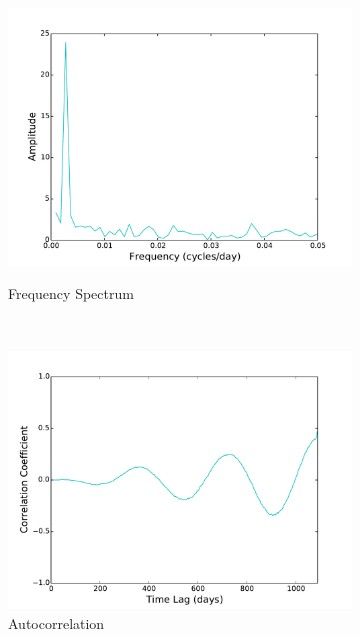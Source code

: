 \documentclass[11pt, letterpaper]{article}
\begin{document}
\begin{figure}[H]
  ~
  \begin{subfigure}[b]{0.45\textwidth}
    \includegraphics[width=\textwidth]{figures/average_daily_temp_fft.pdf}
    \label{fig:analysis-ft}
    \caption{Frequency Spectrum}
  \end{subfigure}
  ~
  \begin{subfigure}[b]{0.45\textwidth}
    \includegraphics[width=\textwidth]{figures/average_daily_temp_autocorr.pdf}
    \caption{\label{fig:analysis-autocorr} Autocorrelation}
  \end{subfigure}
  ~
  \begin{subfigure}[b]{0.45\textwidth}

\end{subfigure}
\end{figure}
\end{document}
